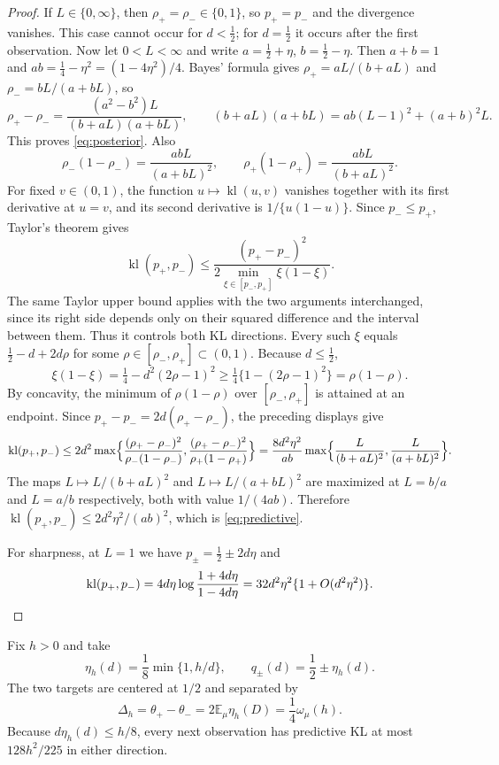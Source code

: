 \documentclass[11pt,a4paper]{article}
\theoremstyle{definition}
\newcommand{\E}{\mathbb E}
\newcommand{\om}{\omega_\mu}
\begin{document}
\begin{proof}
If $L\in\{0,\infty\}$, then $\rho_+=\rho_-\in\{0,1\}$, so $p_+=p_-$ and the divergence vanishes.
This case cannot occur for $d<\tfrac12$; for $d=\tfrac12$ it occurs after the first
observation. Now let $0<L<\infty$ and write $a=\tfrac12+\eta$, $b=\tfrac12-\eta$. Then
$a+b=1$ and $ab=\tfrac14-\eta^2=(1-4\eta^2)/4$. Bayes' formula gives
$\rho_+=aL/(b+aL)$ and $\rho_-=bL/(a+bL)$, so
\[
\rho_+-\rho_-=\frac{(a^2-b^2)L}{(b+aL)(a+bL)},\qquad
(b+aL)(a+bL)=ab(L-1)^2+(a+b)^2L .
\]
This proves \eqref{eq:posterior}. Also
\[
\rho_-(1-\rho_-)=\frac{abL}{(a+bL)^2},\qquad
\rho_+(1-\rho_+)=\frac{abL}{(b+aL)^2}.
\]
For fixed $v\in(0,1)$, the function $u\mapsto\operatorname{kl}(u,v)$ vanishes together with its
first derivative at $u=v$, and its second derivative is $1/\{u(1-u)\}$. Since
$p_-\le p_+$, Taylor's theorem gives
\[
\operatorname{kl}(p_+,p_-)\le\frac{(p_+-p_-)^2}{2\min_{\xi\in[p_-,p_+]}\xi(1-\xi)}.
\]
The same Taylor upper bound applies with the two arguments interchanged,
since its right side depends only on their squared difference and the
interval between them. Thus it controls both KL directions.
Every such $\xi$ equals $\tfrac12-d+2d\rho$ for some $\rho\in[\rho_-,\rho_+]\subset(0,1)$. Because
$d\le\tfrac12$,
\[
\xi(1-\xi)=\tfrac14-d^2(2\rho-1)^2\ge\tfrac14\{1-(2\rho-1)^2\}=\rho(1-\rho).
\]
By concavity, the minimum of $\rho(1-\rho)$ over $[\rho_-,\rho_+]$ is attained at an endpoint.
Since $p_+-p_-=2d(\rho_+-\rho_-)$, the preceding displays give
\[
\operatorname{kl}(p_+,p_-)\le
2d^2\max\Bigl\{\frac{(\rho_+-\rho_-)^2}{\rho_-(1-\rho_-)},
\frac{(\rho_+-\rho_-)^2}{\rho_+(1-\rho_+)}\Bigr\}
=\frac{8d^2\eta^2}{ab}\max\Bigl\{\frac{L}{(b+aL)^2},\frac{L}{(a+bL)^2}\Bigr\}.
\]
The maps $L\mapsto L/(b+aL)^2$ and $L\mapsto L/(a+bL)^2$ are maximized at $L=b/a$ and
$L=a/b$ respectively, both with value $1/(4ab)$. Therefore
$\operatorname{kl}(p_+,p_-)\le2d^2\eta^2/(ab)^2$, which is \eqref{eq:predictive}.

For sharpness, at $L=1$ we have $p_\pm=\tfrac12\pm2d\eta$ and
\[
\operatorname{kl}(p_+,p_-)=4d\eta\log\frac{1+4d\eta}{1-4d\eta}=32d^2\eta^2\{1+O(d^2\eta^2)\}.
\qedhere
\]
\end{proof}

Fix $h>0$ and take
\begin{equation}\label{eq:hard-pair}
 \eta_h(d)=\frac18\min\{1,h/d\},\qquad
 q_\pm(d)=\frac12\pm\eta_h(d).
\end{equation}
The two targets are centered at $1/2$ and separated by
\begin{equation}\label{eq:separation}
 \Delta_h=\theta_+-\theta_-=2\E_\mu\eta_h(D)=\frac14\om(h).
\end{equation}
Because $d\eta_h(d)\le h/8$, every next observation has predictive KL at
most $128h^2/225$ in either direction.
\end{document}
